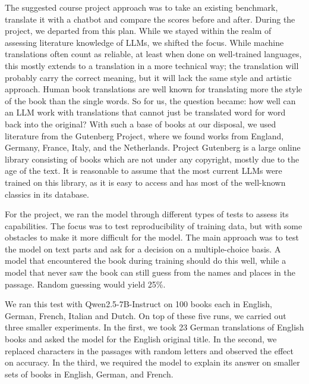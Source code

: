 \documentclass[11pt]{article}
\begin{document}
The suggested course project approach was to take an existing benchmark, translate it with a chatbot and compare the scores before and after. During the project, we departed from this plan. While we stayed within the realm of assessing literature knowledge of LLMs, we shifted the focus.  
While machine translations often count as reliable, at least when done on well-trained languages, this mostly extends to a translation in a more technical way; the translation will probably carry the correct meaning, but it will lack the same style and artistic approach. Human book translations are well known for translating more the style of the book than the single words. So for us, the question became: how well can an LLM work with translations that cannot just be translated word for word back into the original? With such a base of books at our disposal, we used literature from the Gutenberg Project, where we found works from England, Germany, France, Italy, and the Netherlands. Project Gutenberg is a large online library consisting of books which are not under any copyright, mostly due to the age of the text. It is reasonable to assume that the most current LLMs were trained on this library, as it is easy to access and has most of the well-known classics in its database. 

For the project, we ran the model through different types of tests to assess its capabilities. The focus was to test reproducibility of training data, but with some obstacles to make it more difficult for the model. The main approach was to test the model on text parts and ask for a decision on a multiple-choice basis. A model that encountered the book during training should do this well, while a model that never saw the book can still guess from the names and places in the passage. Random guessing would yield 25\%.

We ran this test with Qwen2.5-7B-Instruct on 100 books each in English,
German, French, Italian and Dutch. On top of these five runs, we carried out
three smaller experiments. In the first, we took 23 German translations of
English books and asked the model for the English original title. In the
second, we replaced characters in the passages with random letters
and observed the effect on accuracy. In the third, we required the model to
explain its answer on smaller sets of books in English, German, and French.
\end{document}
